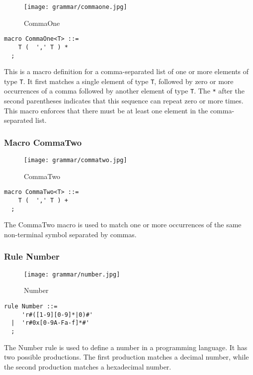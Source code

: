 \begin{figure}
  \centering
  \texttt{[image: grammar/commaone.jpg]}
  \caption{CommaOne}
  \end{figure}

\begin{lstlisting}
macro CommaOne<T> ::=
    T (  ',' T ) *  
  ;
\end{lstlisting}

This is a macro definition for a comma-separated list of one or more elements of type \verb|T|. It first matches a single element of type \verb|T|, followed by zero or more occurrences of a comma followed by another element of type \verb|T|. The \verb|*| after the second parentheses indicates that this sequence can repeat zero or more times. This macro enforces that there must be at least one element in the comma-separated list.

\subsubsection*{Macro CommaTwo}

\begin{figure}
  \centering
  \texttt{[image: grammar/commatwo.jpg]}
  \caption{CommaTwo}
  \end{figure}

\begin{lstlisting}
macro CommaTwo<T> ::=
    T (  ',' T ) +  
  ;
\end{lstlisting}

The CommaTwo macro is used to match one or more occurrences of the same non-terminal symbol separated by commas.

\subsubsection*{Rule Number}

\begin{figure}
  \centering
  \texttt{[image: grammar/number.jpg]}
  \caption{Number}
  \end{figure}

\begin{lstlisting}
rule Number ::=
     'r#([1-9][0-9]*|0)#' 
  |  'r#0x[0-9A-Fa-f]*#' 
  ;
\end{lstlisting}

The Number rule is used to define a number in a programming language. It has two possible productions. The first production matches a decimal number, while the second production matches a hexadecimal number.

